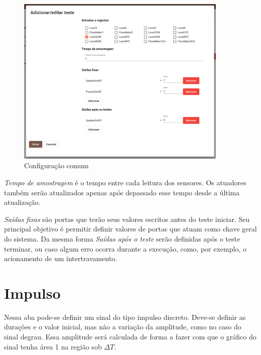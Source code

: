 \begin{figure}[ht!]
    \centering
    \includegraphics[width=0.9\textwidth]{imgs/system-response3}
    \caption[Configuração comum]{Configuração comum}%
    \label{fig:system-response3}
\end{figure}

\textit{Tempo de amostragem} é o tempo entre cada leitura dos sensores. Os
atuadores também serão atualizados apenas após depassado esse tempo desde a
última atualização.

\textit{Saídas fixas} são portas que terão seus valores escritos antes do teste
iniciar. Seu principal objetivo é permitir definir valores de portas que atuam
como chave geral do sistema. Da mesma forma \textit{Saídas após o teste} serão
definidas após o teste terminar, ou caso algum erro ocorra durante a execução,
como, por exemplo, o acionamento de um intertravamento.

\newpage{}
\section{Impulso}%
\label{sec:impulse}

Nessa aba pode-se definir um sinal do tipo impulso discreto. Deve-se definir as
durações e o valor inicial, mas não a variação da amplitude, como no caso do
sinal degrau. Essa amplitude será calculada de forma a fazer com que o gráfico
do sinal tenha área 1 na região sob \(\Delta{}T\).

